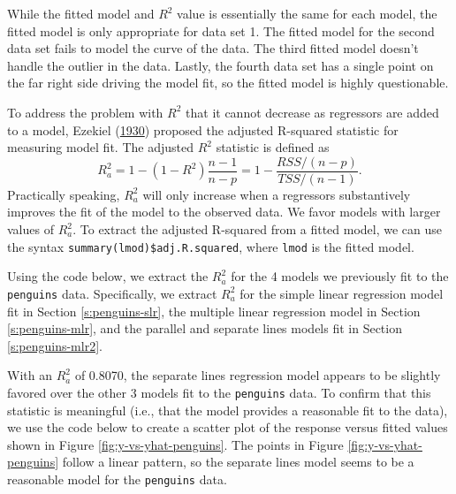 \documentclass[
]{book}
\newenvironment{Shaded}{\begin{snugshade}}{\end{snugshade}}
\newcommand{\CommentTok}[1]{\textcolor[rgb]{0.56,0.35,0.01}{\textit{#1}}}
\newcommand{\DocumentationTok}[1]{\textcolor[rgb]{0.56,0.35,0.01}{\textbf{\textit{#1}}}}
\newcommand{\FunctionTok}[1]{\textcolor[rgb]{0.00,0.00,0.00}{#1}}
\newcommand{\NormalTok}[1]{#1}
\newcommand{\SpecialCharTok}[1]{\textcolor[rgb]{0.00,0.00,0.00}{#1}}
\theoremstyle{definition}
\theoremstyle{definition}
\theoremstyle{definition}
\theoremstyle{definition}
\theoremstyle{remark}
\begin{document}
While the fitted model and \(R^2\) value is essentially the same for each model, the fitted model is only appropriate for data set 1. The fitted model for the second data set fails to model the curve of the data. The third fitted model doesn't handle the outlier in the data. Lastly, the fourth data set has a single point on the far right side driving the model fit, so the fitted model is highly questionable.

To address the problem with \(R^2\) that it cannot decrease as regressors are added to a model, Ezekiel (\protect\hyperlink{ref-ezekiel1930methods}{1930}) proposed the adjusted R-squared statistic for measuring model fit. The adjusted \(R^2\) statistic is defined as
\[
R^2_a=1-(1-R^2)\frac{n-1}{n-p}=1-\frac{RSS/(n-p)}{TSS/(n-1)}.
\]
Practically speaking, \(R^2_a\) will only increase when a regressors substantively improves the fit of the model to the observed data. We favor models with larger values of \(R^2_a\). To extract the adjusted R-squared from a fitted model, we can use the syntax \texttt{summary(lmod)\$adj.R.squared}, where \texttt{lmod} is the fitted model.

Using the code below, we extract the \(R^2_a\) for the 4 models we previously fit to the \texttt{penguins} data. Specifically, we extract \(R_a^2\) for the simple linear regression model fit in Section \ref{s:penguins-slr}, the multiple linear regression model in Section \ref{s:penguins-mlr}, and the parallel and separate lines models fit in Section \ref{s:penguins-mlr2}.

\begin{Shaded}
\end{Shaded}

With an \(R_a^2\) of 0.8070, the separate lines regression model appears to be slightly favored over the other 3 models fit to the \texttt{penguins} data. To confirm that this statistic is meaningful (i.e., that the model provides a reasonable fit to the data), we use the code below to create a scatter plot of the response versus fitted values shown in Figure \ref{fig:y-vs-yhat-penguins}. The points in Figure \ref{fig:y-vs-yhat-penguins} follow a linear pattern, so the separate lines model seems to be a reasonable model for the \texttt{penguins} data.
\end{document}
